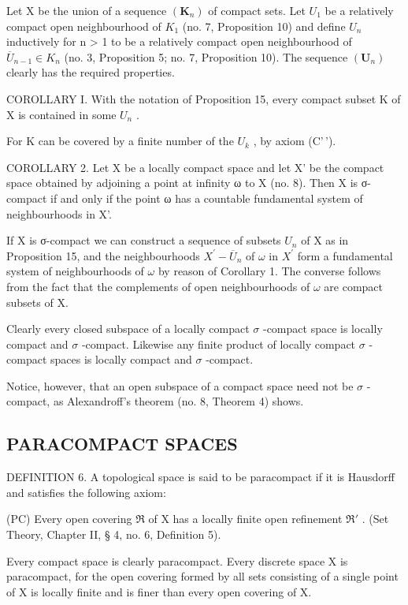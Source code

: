 Let X be the union of a sequence \((\mathbf{K}_{n})\) of compact sets. Let \(U_{1}\) be a relatively compact open neighbourhood of \(K_{1}\) (no. 7, Proposition 10) and define \(U_{n}\) inductively for n \textgreater{} 1 to be a relatively compact open neighbourhood of \(\overline{U}_{n-1} \in K_{n}\) (no. 3, Proposition 5; no. 7, Proposition 10). The sequence \((\mathbf{U}_{n})\) clearly has the required properties.

COROLLARY I. With the notation of Proposition 15, every compact subset K of X is contained in some \(U_{n}\) .

For K can be covered by a finite number of the \(U_{k}\) , by axiom (C'\,').

COROLLARY 2. Let X be a locally compact space and let X' be the compact space obtained by adjoining a point at infinity ω to X (no. 8). Then X is σ-compact if and only if the point ω has a countable fundamental system of neighbourhoods in X'.

If X is σ-compact we can construct a sequence of subsets \(U_{n}\) of X as in Proposition 15, and the neighbourhoods \(X^{\prime}-\overline{U}_{n}\) of \(\omega\) in \(X^{\prime}\) form a fundamental system of neighbourhoods of \(\omega\) by reason of Corollary 1. The converse follows from the fact that the complements of open neighbourhoods of \(\omega\) are compact subsets of X.

Clearly every closed subspace of a locally compact \(\sigma\) -compact space is locally compact and \(\sigma\) -compact. Likewise any finite product of locally compact \(\sigma\) -compact spaces is locally compact and \(\sigma\) -compact.

Notice, however, that an open subspace of a compact space need not be \(\sigma\) -compact, as Alexandroff's theorem (no. 8, Theorem 4) shows.

\subsection{PARACOMPACT SPACES}

DEFINITION 6. A topological space is said to be paracompact if it is Hausdorff and satisfies the following axiom:

(PC) Every open covering \(\Re\) of X has a locally finite open refinement \(\Re'\) . (Set Theory, Chapter II, § 4, no. 6, Definition 5).

Every compact space is clearly paracompact. Every discrete space X is paracompact, for the open covering formed by all sets consisting of a single point of X is locally finite and is finer than every open covering of X.

